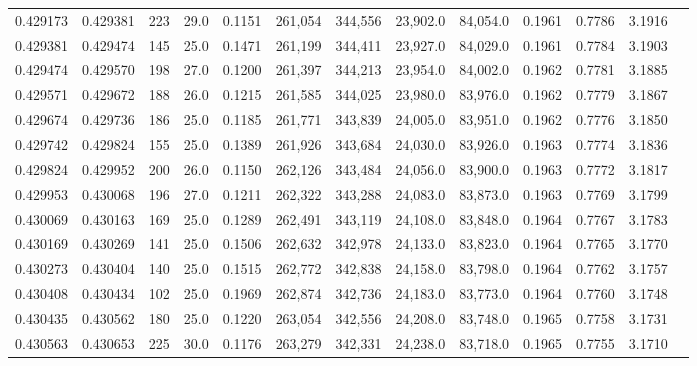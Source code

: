 \begin{tabular}{rrrrrrrrrrrrr}
0.429173 & 0.429381 &   223 & 29.0 &                                     0.1151 & 261,054 & 344,556 &  23,902.0 &  84,054.0 & 0.1961 & 0.7786 & 3.1916 \\
0.429381 & 0.429474 &   145 & 25.0 &                                     0.1471 & 261,199 & 344,411 &  23,927.0 &  84,029.0 & 0.1961 & 0.7784 & 3.1903 \\
0.429474 & 0.429570 &   198 & 27.0 &                                     0.1200 & 261,397 & 344,213 &  23,954.0 &  84,002.0 & 0.1962 & 0.7781 & 3.1885 \\
0.429571 & 0.429672 &   188 & 26.0 &                                     0.1215 & 261,585 & 344,025 &  23,980.0 &  83,976.0 & 0.1962 & 0.7779 & 3.1867 \\
0.429674 & 0.429736 &   186 & 25.0 &                                     0.1185 & 261,771 & 343,839 &  24,005.0 &  83,951.0 & 0.1962 & 0.7776 & 3.1850 \\
0.429742 & 0.429824 &   155 & 25.0 &                                     0.1389 & 261,926 & 343,684 &  24,030.0 &  83,926.0 & 0.1963 & 0.7774 & 3.1836 \\
0.429824 & 0.429952 &   200 & 26.0 &                                     0.1150 & 262,126 & 343,484 &  24,056.0 &  83,900.0 & 0.1963 & 0.7772 & 3.1817 \\
0.429953 & 0.430068 &   196 & 27.0 &                                     0.1211 & 262,322 & 343,288 &  24,083.0 &  83,873.0 & 0.1963 & 0.7769 & 3.1799 \\
0.430069 & 0.430163 &   169 & 25.0 &                                     0.1289 & 262,491 & 343,119 &  24,108.0 &  83,848.0 & 0.1964 & 0.7767 & 3.1783 \\
0.430169 & 0.430269 &   141 & 25.0 &                                     0.1506 & 262,632 & 342,978 &  24,133.0 &  83,823.0 & 0.1964 & 0.7765 & 3.1770 \\
0.430273 & 0.430404 &   140 & 25.0 &                                     0.1515 & 262,772 & 342,838 &  24,158.0 &  83,798.0 & 0.1964 & 0.7762 & 3.1757 \\
0.430408 & 0.430434 &   102 & 25.0 &                                     0.1969 & 262,874 & 342,736 &  24,183.0 &  83,773.0 & 0.1964 & 0.7760 & 3.1748 \\
0.430435 & 0.430562 &   180 & 25.0 &                                     0.1220 & 263,054 & 342,556 &  24,208.0 &  83,748.0 & 0.1965 & 0.7758 & 3.1731 \\
0.430563 & 0.430653 &   225 & 30.0 &                                     0.1176 & 263,279 & 342,331 &  24,238.0 &  83,718.0 & 0.1965 & 0.7755 & 3.1710 \\

\end{tabular}
